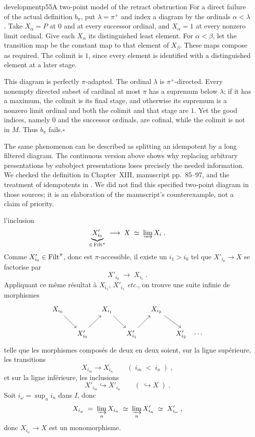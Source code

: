 \begin{dcomment}{development}{p55}{A two-point model of the retract obstruction}
For a direct failure of the actual definition $b_\pi$, put $\lambda=\pi^+$ and index a diagram by the ordinals $\alpha<\lambda$. Take $X_\alpha=P$ at $0$ and at every successor ordinal, and $X_\alpha=1$ at every nonzero limit ordinal. Give each $X_\alpha$ its distinguished least element. For $\alpha<\beta$, let the transition map be the constant map to that element of $X_\beta$. These maps compose as required. The colimit is $1$, since every element is identified with a distinguished element at a later stage.

This diagram is perfectly $\pi$-adapted. The ordinal $\lambda$ is $\pi^+$-directed. Every nonempty directed subset of cardinal at most $\pi$ has a supremum below $\lambda$; if it has a maximum, the colimit is its final stage, and otherwise its supremum is a nonzero limit ordinal and both the colimit and that stage are $1$. Yet the good indices, namely $0$ and the successor ordinals, are cofinal, while the colimit is not in $M$. Thus $b_\pi$ fails.\hfill$\square$

The same phenomenon can be described as splitting an idempotent by a long filtered diagram. The continuous version above shows why replacing arbitrary presentations by subobject presentations loses precisely the needed information. We checked the definition in Chapter~XIII, manuscript pp.~85--97, and the treatment of idempotents in \citep[Expos\'e~I, 8.6.5 and 10.6]{SGA4I1972}. We did not find this specified two-point diagram in those sources; it is an elaboration of the manuscript's counterexample, not a claim of priority.
\end{dcomment}


l'inclusion
\[
\underbrace{X'_{i_0}}_{\in\, \mathrm{Filt}^\pi} \;\longrightarrow\; X \;\simeq\; \varinjlim X_i \;.
\]
Comme $X'_{i_0} \in \mathrm{Filt}^\pi$, donc est $\pi$-accessible, il existe un $i_1 > i_0$ tel que $X'_{i_0} \longrightarrow X$ se factorise par
\[
X'_{i_0} \;\longrightarrow\; X_{i_1} \;.
\]
Appliquant ce même résultat à $X_{i_1}$, $X'_{i_1}$ \textit{etc.}, on trouve une suite infinie de morphismes
\[
\begin{tikzcd}[column sep=small]
X_{i_0} \arrow[dr] & & X_{i_1} \arrow[dr] & & X_{i_2} \arrow[dr] & \\
& X'_{i_0} \arrow[ur] & & X'_{i_1} \arrow[ur] & & X'_{i_2} \quad \cdots
\end{tikzcd}
\]
telle que les morphismes composés de deux en deux soient, sur la ligne supérieure, les transitions
\[
X_{i_m} \longrightarrow X_{i_n} \qquad (\; i_m \;<\; i_n \;) \;,
\]
et sur la ligne inférieure, les inclusions
\[
X'_{i_m} \hookrightarrow X'_{i_n} \qquad (\; \hookrightarrow X \;) \;.
\]
Soit $i_\omega = \sup_n i_n$ dans $I$, donc
\[
X_{i_\omega} \;=\; \varinjlim_{n} X_{i_n} \;\simeq\; \varinjlim_{n} X'_{i_n} \;\simeq\; X'_{i_\omega} \;,
\]
donc $X_{i_\omega} \longrightarrow X$ est un monomorphisme.


